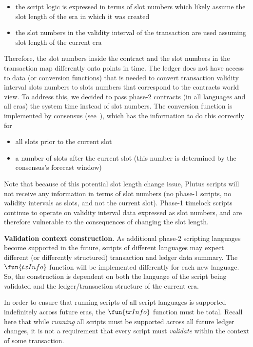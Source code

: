 \begin{itemize}
  \item the script logic is expressed in terms of slot numbers
  which likely assume the slot length of the era in which it was created
  \item the slot numbers in the validity interval of the transaction are used
  assuming slot length of the current era
\end{itemize}

Therefore, the slot numbers inside the contract and the slot numbers in the transaction
map differently onto points in time. The ledger does not have access to data (or conversion functions)
that is needed to convert transaction validity interval slots numbers to slots numbers
that correspond to the contracts world view. To address this, we decided to pass
phase-2 contracts (in all languages and all eras) the system time instead of slot numbers.
The conversion function is implemented by consensus (see~\cite{cardano_consensus}),
which has the information to do this correctly for

\begin{itemize}
  \item all slots prior to the current slot
  \item a number of slots after the current slot (this number is determined by
  the consensus's forecast window)
\end{itemize}

Note that because of this potential slot length change issue, Plutus scripts will
not receive any information in terms of slot numbers (no phase-1 scripts, no
validity intervals as slots, and not the current slot). Phase-1 timelock scripts
continue to operate on validity interval data expressed as slot numbers, and are
therefore vulnerable to the consequences of changing the slot length.

\textbf{Validation context construction.}
  As additional phase-2 scripting languages become supported in the future, scripts of different
  languages may expect different (or differently structured) transaction and ledger data summary.
  The $\fun{txInfo}$ function will be implemented differently
  for each new language. So, the construction is
  dependent on both the language of the script being validated and the ledger/transaction structure
  of the current era.

  In order to ensure that running scripts of all script languages is supported indefinitely across
  future eras, the $\fun{txInfo}$ function must be total.
  Recall here that while \emph{running} all scripts must be supported across
  all future ledger changes,
  it is not a requirement that every script must \emph{validate} within the context of some transaction.

